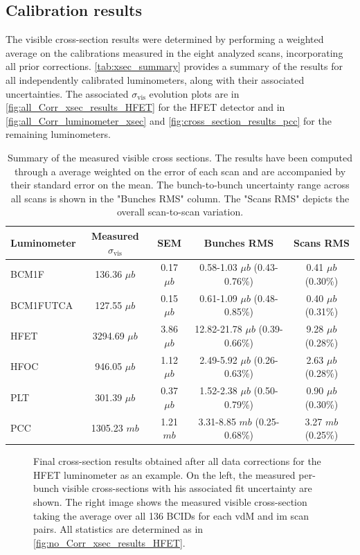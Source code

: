 \subsection{Calibration results}

The visible cross-section results were determined by performing a weighted average on the calibrations measured in the eight analyzed scans, incorporating all prior corrections. \autoref{tab:xsec_summary} provides a summary of the results for all independently calibrated luminometers, along with their associated uncertainties. The associated $\sigma_{\mathrm{vis}}$ evolution plots are in \autoref{fig:all_Corr_xsec_results_HFET} for the HFET detector and in \autoref{fig:all_Corr_luminometer_xsec} and \autoref{fig:cross_section_results_pcc} for the remaining luminometers.

\begin{table}[!htb]
	\caption[Summary of visible cross-sections results]{Summary of the measured visible cross sections. The results have been computed through a average weighted on the error of each scan and are accompanied by their standard error on the mean. The bunch-to-bunch uncertainty range across all scans is shown in the "Bunches RMS" column. The "Scans RMS" depicts the overall scan-to-scan variation. }
	
	\label{tab:xsec_summary}
	\centering
	\begin{tabular}{lcccc}
		\hline
		Luminometer & Measured $\sigma_\mathrm{vis}$ & SEM  & Bunches RMS & Scans RMS \\
		\hline
		BCM1F & 136.36 $\mu b$ & 0.17 $\mu b$ & 0.58-1.03 $\mu b$ (0.43-0.76\%) & 0.41 $\mu b$ (0.30\%) \\
		BCM1FUTCA & 127.55 $\mu b$ & 0.15 $\mu b$ & 0.61-1.09 $\mu b$ (0.48-0.85\%) & 0.40 $\mu b$ (0.31\%) \\
		HFET & 3294.69 $\mu b$ & 3.86 $\mu b$ & 12.82-21.78 $\mu b$ (0.39-0.66\%) & 9.28 $\mu b$ (0.28\%) \\
		HFOC & 946.05 $\mu b$ & 1.12 $\mu b$ & 2.49-5.92 $\mu b$ (0.26-0.63\%) & 2.63 $\mu b$ (0.28\%) \\
		PLT & 301.39 $\mu b$ & 0.37 $\mu b$ & 1.52-2.38 $\mu b$ (0.50-0.79\%) & 0.90 $\mu b$ (0.30\%) \\
		PCC & 1305.23 $mb$ & 1.21 $mb$ & 3.31-8.85 $mb$ (0.25-0.68\%) & 3.27 $mb$ (0.25\%) \\
		\hline
	\end{tabular}
\end{table}

\begin{figure}[!htb]
	\centering
	\caption[Final HFET cross-section results]{Final cross-section results obtained after all data corrections for the HFET luminometer as an example. On the left, the measured per-bunch visible cross-sections with his associated fit uncertainty are shown. The right image shows the measured visible cross-section taking the average over all 136 BCIDs for each vdM and im scan pairs. All statistics are determined as in \autoref{fig:no_Corr_xsec_results_HFET}.}
	\label{fig:all_Corr_xsec_results_HFET}
\end{figure}

